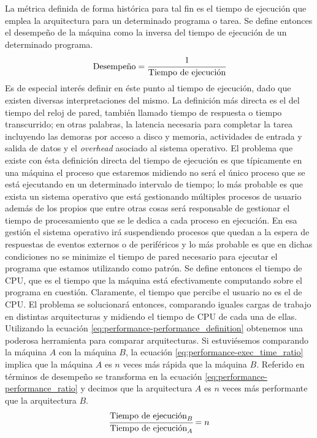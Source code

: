 La métrica definida de forma histórica para tal fin es el tiempo de ejecución 
que emplea la arquitectura para un determinado programa o tarea. Se define 
entonces el desempeño de la máquina como la inversa del tiempo de ejecución de 
un determinado programa.
\begin{equation}
  \label{eq:performance-performance_definition}
  \text{Desempeño} = \cfrac{1}{\text{Tiempo de ejecución}}
\end{equation}
Es de especial interés definir en éste punto al tiempo de ejecución, dado que 
existen diversas interpretaciones del mismo. La definición más directa es el 
del tiempo del reloj de pared, también llamado tiempo de respuesta o tiempo 
transcurrido; en otras palabras, la latencia necesaria para completar la tarea 
incluyendo las demoras por acceso a disco y memoria, actividades de entrada y 
salida de datos y el \emph{overhead} asociado al sistema operativo. El 
problema que existe con ésta definición directa del tiempo de ejecución es que 
típicamente en una máquina el proceso que estaremos midiendo no será el único 
proceso que se está ejecutando en un determinado intervalo de tiempo; lo más 
probable es que exista un sistema operativo que está gestionando múltiples 
procesos de usuario además de los propios que entre otras cosas será 
responsable de gestionar el tiempo de procesamiento que se le dedica a cada 
proceso en ejecución. En esa gestión el sistema operativo irá suspendiendo 
procesos que quedan a la espera de respuestas de eventos externos o de 
periféricos y lo más probable es que en dichas condiciones no se minimize el 
tiempo de pared necesario para ejecutar el programa que estamos utilizando como 
patrón. Se define entonces el tiempo de CPU, que es el tiempo que la máquina 
está efectivamente computando sobre el programa en cuestión. Claramente, el 
tiempo que percibe el usuario no es el de CPU. El problema se solucionará 
entonces, comparando iguales cargas de trabajo en distintas arquitecturas y 
midiendo el tiempo de CPU de cada una de ellas. Utilizando la ecuación 
\ref{eq:performance-performance_definition} obtenemos una poderosa 
herramienta para comparar arquitecturas. Si estuviésemos comparando la 
máquina $A$ con la máquina $B$, la ecuación 
\ref{eq:performance-exec_time_ratio} implica que la máquina $A$ es $n$ veces más 
rápida que la máquina $B$. Referido en términos de desempeño se transforma en la 
ecuación \ref{eq:performance-performance_ratio} y decimos que la arquitectura 
$A$ es $n$ veces más performante que la arquitectura $B$.
\begin{equation}
  \label{eq:performance-exec_time_ratio}
  \cfrac{\text{Tiempo de ejecución}_{B}}{\text{Tiempo de ejecución}_{A}} = n
\end{equation}
